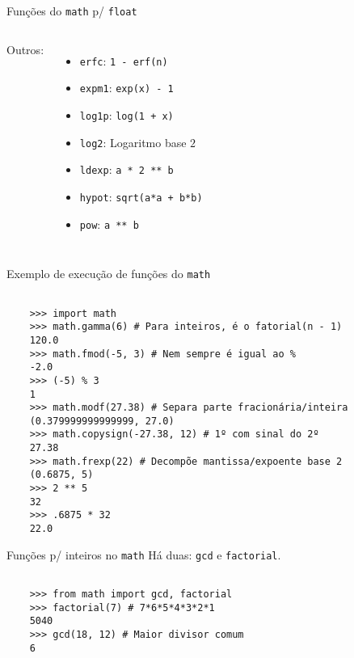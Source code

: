 \documentclass[utf8]{beamer}
\begin{document}
\begin{frame}{Funções do \texttt{math} p/ \texttt{float}}
\begin{columns}
    Outros:
    \begin{itemize}
      \item \texttt{erfc}: \texttt{1 - erf(n)}
      \item \texttt{expm1}: \texttt{exp(x) - 1}
      \item \texttt{log1p}: \texttt{log(1 + x)}
      \item \texttt{log2}: Logaritmo base $2$
      \item \texttt{ldexp}: \texttt{a * 2 ** b}
      \item \texttt{hypot}:
              \texttt{sqrt(a*a + b*b)}
      \item \texttt{pow}: \texttt{a ** b}
    \end{itemize}

  \end{columns}
\end{frame}


\begin{frame}[fragile]{Exemplo de execução de funções do \texttt{math}}
  \begin{verbatim}

    >>> import math
    >>> math.gamma(6) # Para inteiros, é o fatorial(n - 1)
    120.0
    >>> math.fmod(-5, 3) # Nem sempre é igual ao %
    -2.0
    >>> (-5) % 3
    1
    >>> math.modf(27.38) # Separa parte fracionária/inteira
    (0.379999999999999, 27.0)
    >>> math.copysign(-27.38, 12) # 1º com sinal do 2º
    27.38
    >>> math.frexp(22) # Decompõe mantissa/expoente base 2
    (0.6875, 5)
    >>> 2 ** 5
    32
    >>> .6875 * 32
    22.0

  \end{verbatim}
\end{frame}


\begin{frame}[fragile]{Funções p/ inteiros no \texttt{math}}
  Há duas: \texttt{gcd} e \texttt{factorial}.

  \begin{verbatim}

    >>> from math import gcd, factorial
    >>> factorial(7) # 7*6*5*4*3*2*1
    5040
    >>> gcd(18, 12) # Maior divisor comum
    6

  \end{verbatim}
\end{frame}
\end{document}
